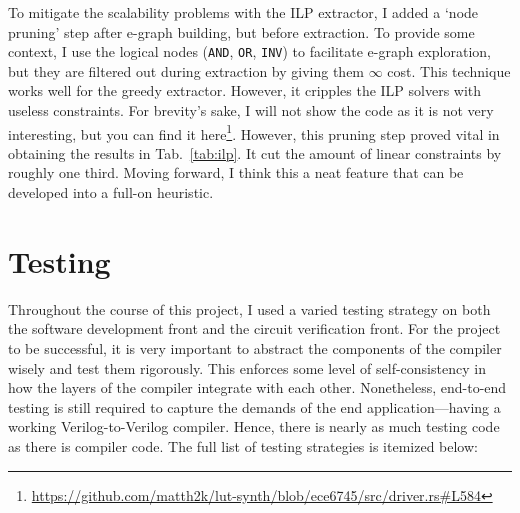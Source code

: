 \documentclass[10pt,letterpaper]{article}
\begin{document}
To mitigate the scalability problems with the ILP extractor, I added a `node
pruning' step after e-graph building, but before extraction. To provide some
context, I use the logical nodes (\texttt{AND}, \texttt{OR}, \texttt{INV}) to
facilitate e-graph exploration, but they are filtered out during extraction by
giving them $\infty$ cost. This technique works well for the greedy extractor.
However, it cripples the ILP solvers with useless constraints. For brevity's
sake, I will not show the code as it is not very interesting, but you can find
it
here\footnote{\href{https://github.com/matth2k/lut-synth/blob/ece6745/src/driver.rs\#L584}{https://github.com/matth2k/lut-synth/blob/ece6745/src/driver.rs\#L584}}.
However, this pruning step proved vital in obtaining the results in
Tab.~\ref{tab:ilp}. It cut the amount of linear constraints by roughly one
third. Moving forward, I think this a neat feature that can be developed into a
full-on heuristic.

\section{Testing}\label{sec:testing}

Throughout the course of this project, I used a varied testing strategy on both
the software development front and the circuit verification front. For the
project to be successful, it is very important to abstract the components of
the compiler wisely and test them rigorously. This enforces some level of
self-consistency in how the layers of the compiler integrate with each other.
Nonetheless, end-to-end testing is still required to capture the demands of the
end application---having a working Verilog-to-Verilog compiler. Hence, there is
nearly as much testing code as there is compiler code. The full list of testing
strategies is itemized below:
\end{document}
